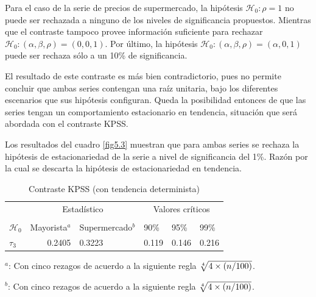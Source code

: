 \documentclass[12pt, twoside]{book}\usepackage[]{graphicx}\usepackage[]{color}
\numberwithin{equation}{section}
\numberwithin{theorem}{section}
\numberwithin{teorema}{section}
\numberwithin{defi}{section}
\numberwithin{prop}{section}
\numberwithin{defi}{section}
\theoremstyle{plain}
\begin{document}
Para el caso de la serie de precios de supermercado, la hipótesis $\mathcal{H}_{0}: \rho=1$ no puede ser rechazada a ninguno de los niveles de significancia propuestos. Mientras que el contraste tampoco provee información suficiente para rechazar $\mathcal{H}_{0}: (\alpha, \beta, \rho)=(0,0,1)$. Por último, la hipótesis $\mathcal{H}_{0}: (\alpha, \beta,\rho)=(\alpha,0,1)$ puede ser rechaza sólo a un 10\% de significancia. 

El resultado de este contraste es más bien contradictorio, pues no permite concluir que ambas series contengan una raíz unitaria, bajo los diferentes escenarios que sus hipótesis configuran. Queda la posibilidad entonces de que las series tengan un comportamiento estacionario en tendencia, situación que será abordada con el contraste KPSS. 

Los resultados del cuadro \ref{fig5.3}  muestran que para ambas series se rechaza la hipótesis de estacionariedad de la serie a nivel de significancia del 1\%. Razón por la cual se descarta la hipótesis de estacionariedad en tendencia. 

\begin{table}[h]
\centering
\begin{threeparttable}
\caption{Contraste KPSS (con tendencia determinista) \label{fig5.3}}
\begin{tabular}{@{}lrllll@{}}
\toprule
\multicolumn{1}{l}{} & \multicolumn{2}{c}{Estadístico} &
\multicolumn{3}{c}{Valores críticos} \\
\cmidrule(l){2-3} \cmidrule(l){4-6} \\
\multicolumn{1}{l}{$\mathcal{H}_0$} & \multicolumn{1}{c}{Mayorista$^{a}$} &
 \multicolumn{1}{c}{Supermercado$^{b}$} &
\multicolumn{1}{l}{90\%}&
\multicolumn{1}{l}{95\%}&
\multicolumn{1}{l}{99\%}
\\
\midrule
$\tau_{3} $  & 0.2405 &  0.3223 & 0.119 & 0.146 & 0.216 \\
\bottomrule
\end{tabular}
\label{tab-6}
\begin{tablenotes}
\small 
\item $^{a}$: Con cinco rezagos de acuerdo a la siguiente regla $\root 4 \of {4 \times (n/100)}$. 
\item $^{b}$: Con cinco rezagos de acuerdo a la siguiente regla $\root 4 \of {4 \times (n/100)}$. 
\end{tablenotes}
\end{threeparttable}
\end{table}
\end{document}
